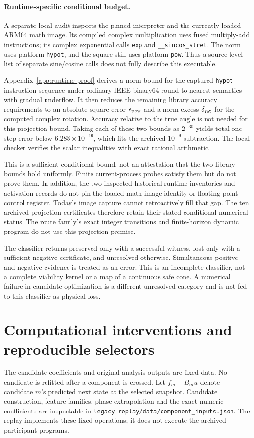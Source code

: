 \paragraph{Runtime-specific conditional budget.}
A separate local audit inspects the pinned interpreter and the currently
loaded ARM64 math image. Its compiled complex multiplication uses fused
multiply-add instructions; its complex exponential calls
\texttt{exp} and \texttt{\_\_sincos\_stret}. The norm uses platform
\texttt{hypot}, and the square still uses platform \texttt{pow}.
Thus a source-level list of separate sine/cosine calls does not fully
describe this executable.

Appendix~\ref{app:runtime-proof} derives a norm bound for the captured
\texttt{hypot} instruction sequence under ordinary IEEE binary64
round-to-nearest semantics with gradual underflow. It then reduces the
remaining library accuracy requirements to an absolute square error
$\epsilon_{\rm pow}$ and a norm excess $\delta_{\rm rot}$ for the
computed complex rotation. Accuracy relative to the true angle is not
needed for this projection bound. Taking each of these two bounds as
$2^{-30}$ yields total one-step error below $6.288\times10^{-10}$,
which fits the archived $10^{-9}$ subtraction. The local checker verifies
the scalar inequalities with exact rational arithmetic.

This is a sufficient conditional bound, not an attestation that the two
library bounds hold uniformly. Finite current-process probes satisfy them
but do not prove them. In addition, the two inspected historical runtime
inventories and activation records do not pin the loaded math-image
identity or floating-point control register. Today's image capture cannot
retroactively fill that gap. The ten archived projection certificates
therefore retain their stated conditional numerical status. The route
family's exact integer transitions and finite-horizon dynamic program do
not use this projection premise.

The classifier returns preserved only with a successful witness, lost only with a sufficient negative certificate, and unresolved otherwise. Simultaneous positive and negative evidence is treated as an error. This is an incomplete classifier, not a complete viability kernel or a map of a continuous safe cone. A numerical failure in candidate optimization is a different unresolved category and is not fed to this classifier as physical loss.

\section{Computational interventions and reproducible selectors}
\label{app:components}
The candidate coefficients and original analysis outputs are fixed data. No candidate is refitted after a component is crossed. Let $f_m+B_m u$ denote candidate $m$'s predicted next state at the selected snapshot. Candidate construction, feature families, phase extrapolation and the exact numeric coefficients are inspectable in \texttt{legacy-replay/data/component\_inputs.json}. The replay implements these fixed operations; it does not execute the archived participant programs.

